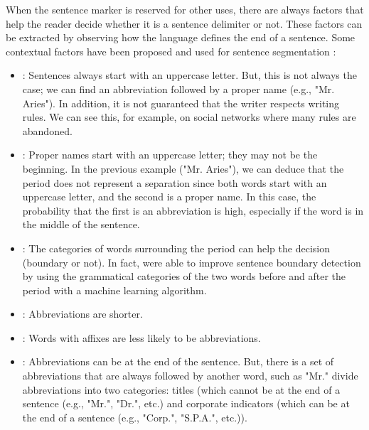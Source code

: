 \documentclass{KBook}
\begin{document}
When the sentence marker is reserved for other uses, there are always factors that help the reader decide whether it is a sentence delimiter or not. These factors can be extracted by observing how the language defines the end of a sentence. Some contextual factors have been proposed and used for sentence segmentation \cite{10-palmer}:
\begin{itemize}
	\item {}: Sentences always start with an uppercase letter. But, this is not always the case; we can find an abbreviation followed by a proper name (e.g., "Mr. Aries"). In addition, it is not guaranteed that the writer respects writing rules. We can see this, for example, on social networks where many rules are abandoned.
	
	\item {}: Proper names start with an uppercase letter; they may not be the beginning. In the previous example ("Mr. Aries"), we can deduce that the period does not represent a separation since both words start with an uppercase letter, and the second is a proper name. In this case, the probability that the first is an abbreviation is high, especially if the word is in the middle of the sentence.
	
	\item {}: The categories of words surrounding the period can help the decision (boundary or not). In fact, \citet{97-palmer-hearst} were able to improve sentence boundary detection by using the grammatical categories of the two words before and after the period with a machine learning algorithm.
	
	\item {}: Abbreviations are shorter.
	
	\item {}: Words with affixes are less likely to be abbreviations.
	
	\item {}: Abbreviations can be at the end of the sentence. But, there is a set of abbreviations that are always followed by another word, such as "Mr." \citet{89-riley,97-reynar-ratnaparkhi} divide abbreviations into two categories: titles (which cannot be at the end of a sentence (e.g., "Mr.", "Dr.", etc.) and corporate indicators (which can be at the end of a sentence (e.g., "Corp.", "S.P.A.", etc.)).
\end{itemize}
\end{document}
